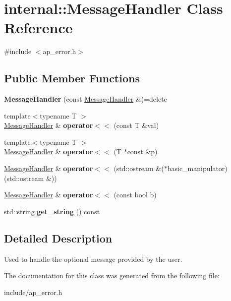 \hypertarget{classinternal_1_1MessageHandler}{}\section{internal\+:\+:Message\+Handler Class Reference}
\label{classinternal_1_1MessageHandler}


{\ttfamily \#include $<$ap\+\_\+error.\+h$>$}

\subsection*{Public Member Functions}
\begin{DoxyCompactItemize}
\item 
\mbox{\label{classinternal_1_1MessageHandler_ae6f8cce5c4e63f5fbd24550638ae94ac}} 
{\bfseries Message\+Handler} (const \hyperlink{classinternal_1_1MessageHandler}{Message\+Handler} \&)=delete
\item 
\mbox{\label{classinternal_1_1MessageHandler_ab3561178b4952351555dd20b8c245d30}} 
{\footnotesize template$<$typename T $>$ }\\\hyperlink{classinternal_1_1MessageHandler}{Message\+Handler} \& {\bfseries operator$<$$<$} (const T \&val)
\item 
\mbox{\label{classinternal_1_1MessageHandler_a62dc6345de7a2ba36acb53ecb21b9974}} 
{\footnotesize template$<$typename T $>$ }\\\hyperlink{classinternal_1_1MessageHandler}{Message\+Handler} \& {\bfseries operator$<$$<$} (T $\ast$const \&p)
\item 
\mbox{\label{classinternal_1_1MessageHandler_a5da62bbfd05db615ed2a91922089a2d4}} 
\hyperlink{classinternal_1_1MessageHandler}{Message\+Handler} \& {\bfseries operator$<$$<$} (std\+::ostream \&($\ast$basic\+\_\+manipulator)(std\+::ostream \&))
\item 
\mbox{\label{classinternal_1_1MessageHandler_a2ea03103c04bdd970bbce89de6cdacff}} 
\hyperlink{classinternal_1_1MessageHandler}{Message\+Handler} \& {\bfseries operator$<$$<$} (const bool b)
\item 
\mbox{\label{classinternal_1_1MessageHandler_adb324c9b319818a182da7528c3d77dbf}} 
std\+::string {\bfseries get\+\_\+string} () const
\end{DoxyCompactItemize}


\subsection{Detailed Description}
Used to handle the optional message provided by the user. 

The documentation for this class was generated from the following file\+:\begin{DoxyCompactItemize}
\item 
include/ap\+\_\+error.\+h\end{DoxyCompactItemize}

